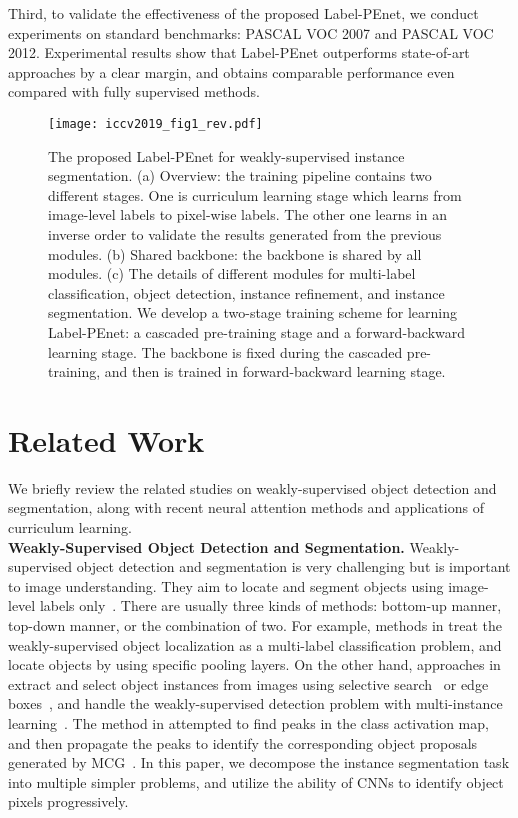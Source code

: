 \documentclass[10pt,twocolumn,letterpaper]{article}
\begin{document}
Third, to validate the effectiveness of the proposed Label-PEnet, we conduct experiments on standard benchmarks: PASCAL VOC 2007 and PASCAL VOC 2012. Experimental results show that Label-PEnet outperforms state-of-art approaches by a clear margin, and obtains comparable performance even compared with fully supervised methods.

\begin{figure*}[ht]
	\centering
	\texttt{[image: iccv2019\_fig1\_rev.pdf]}
\vspace{-6mm}
	\caption{The proposed Label-PEnet for weakly-supervised instance segmentation. (a) Overview: the training pipeline contains two different stages. One is curriculum learning stage which learns from image-level labels to pixel-wise labels. The other one learns in an inverse order to validate the results generated from the previous modules. (b) Shared backbone: the backbone is shared by all modules. (c) The details of different modules for multi-label classification, object detection, instance refinement, and instance segmentation. We develop a two-stage training scheme for learning Label-PEnet: a cascaded pre-training stage and a forward-backward learning stage. The backbone is fixed during the cascaded pre-training, and then is trained in forward-backward learning stage.}
	\label{Fig:WSIS}
\end{figure*}

\section{Related Work}
We briefly review the related studies on weakly-supervised object detection and segmentation, along with recent neural attention methods and applications of curriculum learning. \\

\noindent\textbf{Weakly-Supervised Object Detection and Segmentation.} Weakly-supervised object detection and segmentation is very challenging but is important to image understanding. They aim to locate and segment objects using image-level labels only~\cite{oquab2015object,diba2016weakly}. There are usually three kinds of methods: bottom-up manner, top-down manner, or the combination of two. For example, methods in \cite{oquab2015object,durand2016weldon,durand2017wildcat} treat the weakly-supervised object localization as a multi-label classification problem, and locate objects by using specific pooling layers. On the other hand, approaches in \cite{bilen2016weakly,tang2017multiple} extract and select object instances from images using selective search~\cite{uijlings2013selective} or edge boxes~\cite{zitnick2014edge}, and handle the weakly-supervised detection problem with multi-instance learning~\cite{dietterich1997solving}. The method in \cite{zhou2018weakly} attempted to find peaks in the class activation map, and then propagate the peaks to identify the corresponding object proposals generated by MCG~\cite{pont2017multiscale}. In this paper, we decompose the instance segmentation task into multiple simpler problems, and utilize the ability of CNNs to identify object pixels progressively. \\
\vspace{-0mm}
\end{document}
